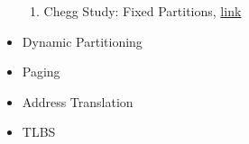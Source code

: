 \documentclass[12pt]{article}
\begin{document}
\begin{itemize}
    \begin{enumerate}[1)]
        \item Chegg Study: Fixed Partitions, \href{https://www.chegg.com/homework-help/definitions/fixed-partitions-3}{link}
    \end{enumerate}
    \item Dynamic Partitioning
    \item Paging
    \item Address Translation
    \item TLBS
\end{itemize}
\end{document}
